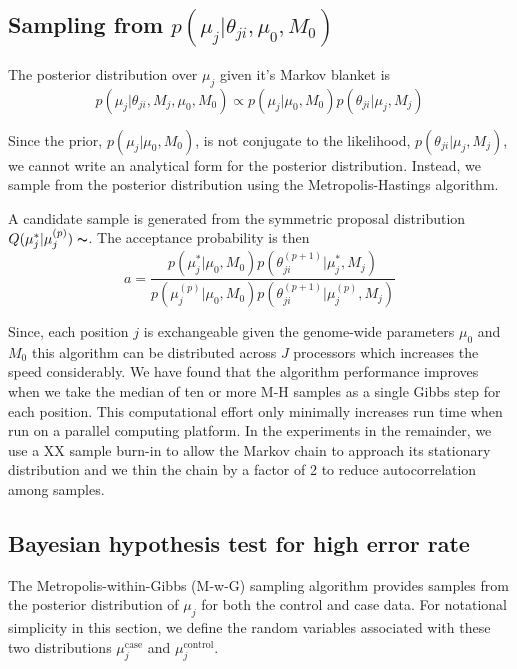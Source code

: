 \documentclass[11pt,reqno]{amsart}
\begin{document}
\subsection{Sampling from $p \left( \mu_j |\theta_{ji},\mu_0,M_0\right)$}
The posterior distribution over $\mu_j$ given it's Markov blanket is 
\begin{equation}
	p( \mu_j | \theta_{ji}, M_j, \mu_0, M_0 ) \propto p(\mu_j | \mu_0, M_0) p(\theta_{ji} | \mu_j, M_j)
\end{equation}

Since the prior, $p(\mu_j | \mu_0, M_0)$, is not conjugate to the likelihood, $p(\theta_{ji} | \mu_j, M_j)$, we cannot write an analytical form for the posterior distribution. Instead, we sample from the posterior distribution using the Metropolis-Hastings algorithm.

A candidate sample is generated from the symmetric proposal distribution $Q(\mu_j^* | \mu_j^{(p)}) \thicksim $. The acceptance probability is then
\begin{equation}
	a = \frac{ p(\mu_j^* | \mu_0, M_0) p(\theta^{(p+1)}_{ji} | \mu_j^*, M_j) } {p(\mu_j^{(p)} | \mu_0, M_0) p(\theta^{(p+1)}_{ji} | \mu_j^{(p)}, M_j)}
\end{equation}

Since, each position $j$ is exchangeable given the genome-wide parameters $\mu_0$ and $M_0$ this algorithm can be distributed across $J$ processors which increases the speed considerably. We have found that the algorithm performance improves when we take the median of ten or more M-H samples as a single Gibbs step for each position. This computational effort only minimally increases run time when run on a parallel computing platform. In the experiments in the remainder, we use a XX sample burn-in to allow the Markov chain to approach its stationary distribution and we thin the chain by a factor of 2 to reduce autocorrelation among samples.

\subsection{Bayesian hypothesis test for high error rate}
The Metropolis-within-Gibbs (M-w-G) sampling algorithm provides samples from the posterior distribution of $\mu_j$ for both the control and case data. For notational simplicity in this section, we define the random variables associated with these two distributions $\mu_j^{\text{case}}$ and $\mu_j^{\text{control}}$.
\end{document}

